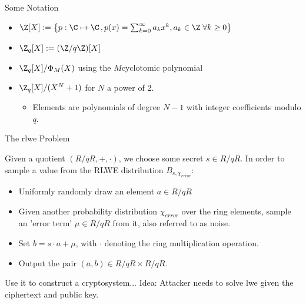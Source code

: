 \begin{frame}{Some Notation}
  \begin{itemize}
    \item $\Z[X] := \big\{p: \C \mapsto \C \,, p(x) = \sum_{k=0}^\infty a_k x^k, a_k \in \Z \;\forall k \geq 0\big\}$
    \item $\Z_q[X] := (\Z/q\Z)[X]$
    \item $\Z_q[X] / \Phi_M(X)$ using the $M$\th cyclotomic polynomial
    \item $\Z_q[X]/(X^N+1)$ for $N$ a power of 2.
          \begin{itemize}
            \item Elements are polynomials of degree $N-1$ with integer coefficients modulo $q$.
          \end{itemize}
  \end{itemize}
\end{frame}

\begin{frame}{The \gls{rlwe} Problem}
  \begin{corollary}
    Given a quotient $(R/qR, +, \cdot)$, we choose some secret $s \in R/qR$.
    In order to sample a value from the RLWE distribution $B_{s, \chi_{error}}$:
    \begin{itemize}
      \item Uniformly randomly draw an element $a \in R/qR$
      \item Given another probability distribution $\chi_{error}$ over the ring elements, sample an 'error term' $\mu \in R/qR$ from it, also referred to as noise.
      \item Set $b = s \cdot a + \mu$, with $\cdot$ denoting the ring multiplication operation.
      \item Output the pair $(a, b) \in R/qR \times R/qR$.
    \end{itemize}
  \end{corollary}

  Use it to construct a cryptosystem...
  Idea: Attacker needs to solve \gls{lwe} given the ciphertext and public key.
\end{frame}
